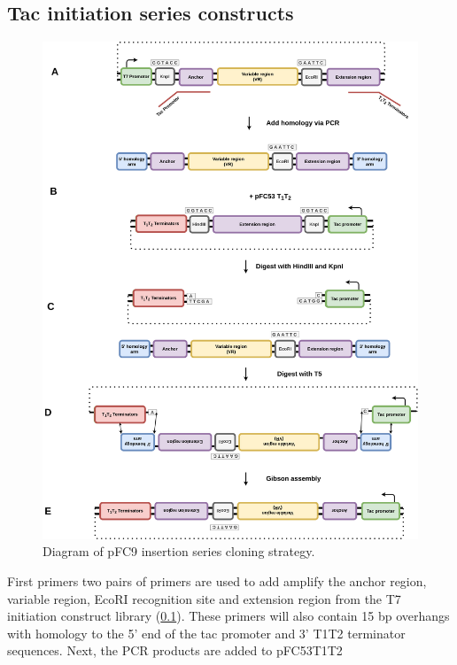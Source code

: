 \documentclass[11pt]{article}
\begin{document}
\subsection{Tac initiation series constructs}
\label{sec:tac-init}

\begin{figure}[H]
	\includegraphics[width=15cm]{images/cloning_diagrams/construct_diagrams-Tac-initiation-series.png}
	\centering
	\caption{Diagram of pFC9 insertion series cloning strategy.}
\end{figure}

First primers two pairs of primers are used to add amplify the anchor region, variable region, EcoRI recognition site and extension region from the T7 initiation construct library (\ref{sec:tac-init}). These primers will also contain 15 bp overhangs with homology to the 5' end of the tac promoter and 3' T1T2 terminator sequences. Next, the PCR products are added to pFC53T1T2 
\end{document}
